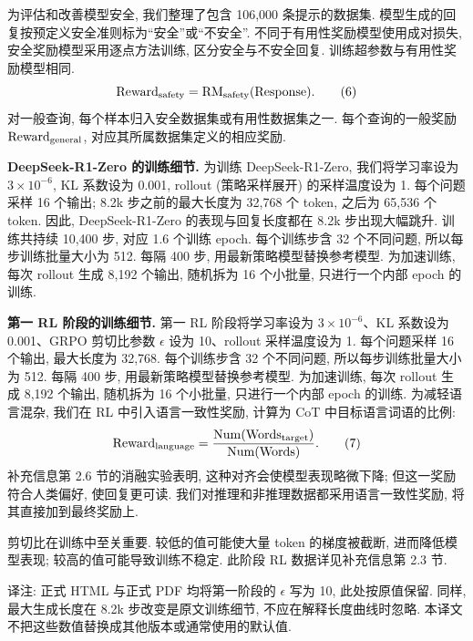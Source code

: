 \label{r1n-methods-safety}
为评估和改善模型安全, 我们整理了包含 106,000 条提示的数据集. 模型生成的回复按预定义安全准则标为“安全”或“不安全”. 不同于有用性奖励模型使用成对损失, 安全奖励模型采用逐点方法训练, 区分安全与不安全回复. 训练超参数与有用性奖励模型相同.
\begin{equation}\label{r1n-eq6}
\operatorname{Reward}_{\rm safety}=\operatorname{RM}_{\rm safety}(\operatorname{Response}).
\tag{6}
\end{equation}
对一般查询, 每个样本归入安全数据集或有用性数据集之一. 每个查询的一般奖励 $\operatorname{Reward}_{\rm general}$, 对应其所属数据集定义的相应奖励.

\label{r1n-methods-training}
\noindent\textbf{DeepSeek-R1-Zero 的训练细节.} 为训练 DeepSeek-R1-Zero, 我们将学习率设为 $3\times10^{-6}$, KL 系数设为 0.001, rollout (策略采样展开) 的采样温度设为 1. 每个问题采样 16 个输出; 8.2k 步之前的最大长度为 32,768 个 token, 之后为 65,536 个 token. 因此, DeepSeek-R1-Zero 的表现与回复长度都在 8.2k 步出现大幅跳升. 训练共持续 10,400 步, 对应 1.6 个训练 epoch. 每个训练步含 32 个不同问题, 所以每步训练批量大小为 512. 每隔 400 步, 用最新策略模型替换参考模型. 为加速训练, 每次 rollout 生成 8,192 个输出, 随机拆为 16 个小批量, 只进行一个内部 epoch 的训练.

\noindent\textbf{第一 RL 阶段的训练细节.} 第一 RL 阶段将学习率设为 $3\times10^{-6}$、KL 系数设为 0.001、GRPO 剪切比参数 $\epsilon$ 设为 10、rollout 采样温度设为 1. 每个问题采样 16 个输出, 最大长度为 32,768. 每个训练步含 32 个不同问题, 所以每步训练批量大小为 512. 每隔 400 步, 用最新策略模型替换参考模型. 为加速训练, 每次 rollout 生成 8,192 个输出, 随机拆为 16 个小批量, 只进行一个内部 epoch 的训练. 为减轻语言混杂, 我们在 RL 中引入语言一致性奖励, 计算为 CoT 中目标语言词语的比例:
\begin{equation}\label{r1n-eq7}
\operatorname{Reward}_{\rm language}
=\frac{\operatorname{Num}(\operatorname{Words}_{\rm target})}
{\operatorname{Num}(\operatorname{Words})}.
\tag{7}
\end{equation}
补充信息第 2.6 节的消融实验表明, 这种对齐会使模型表现略微下降; 但这一奖励符合人类偏好, 使回复更可读. 我们对推理和非推理数据都采用语言一致性奖励, 将其直接加到最终奖励上.

剪切比在训练中至关重要. 较低的值可能使大量 token 的梯度被截断, 进而降低模型表现; 较高的值可能导致训练不稳定. 此阶段 RL 数据详见补充信息第 2.3 节.

\begin{remark}
译注: 正式 HTML 与正式 PDF 均将第一阶段的 $\epsilon$ 写为 10, 此处按原值保留. 同样, 最大生成长度在 8.2k 步改变是原文训练细节, 不应在解释长度曲线时忽略. 本译文不把这些数值替换成其他版本或通常使用的默认值.
\end{remark}

